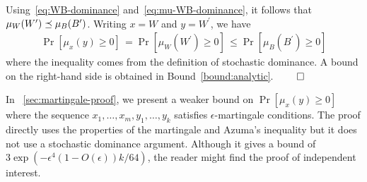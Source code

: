 Using~\eqref{eq:WB-dominance} and~\eqref{eq:mu-WB-dominance}, 
it follows that $\mu_W(W^\prime) \preceq \mu_{B}(B^\prime)$. 
Writing $x = W$ and $y = W^\prime$, we have 
\begin{align*}
  \Pr[\mu_x(y) \geq 0]\, 
    = \Pr[\mu_W(W^\prime) \geq 0]\, 
    \leq \Pr[\mu_{B}(B^\prime) \geq 0]
\end{align*}
where the inequality comes from the definition of stochastic dominance. 
A bound on the right-hand side 
is obtained in Bound~\ref{bound:analytic}. 
\hfill $\qed$






In \Section~\ref{sec:martingale-proof}, 
we present a weaker bound 
on $\Pr[\mu_x(y) \geq 0]$ where the sequence 
$x_1, \ldots, x_m, y_1, \ldots, y_k$ satisfies $\epsilon$-martingale conditions. 
The proof directly uses the properties of the martingale 
and Azuma's inequality  but 
it does not use a stochastic dominance argument. 
Although it gives a bound of $3 \exp\left( -\epsilon^4 (1 - O(\epsilon) ) k/64 \right)$, 
the reader might find the proof of independent interest. 


